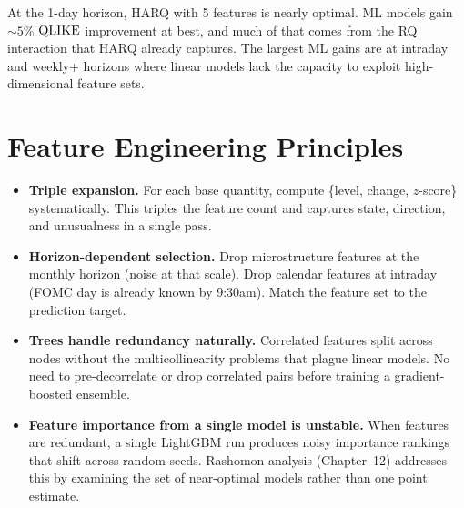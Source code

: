 \begin{warning}
At the 1-day horizon, HARQ with 5 features is nearly optimal.
ML models gain ${\sim}5\%$ $\operatorname{QLIKE}$ improvement at best, and much of that comes from the RQ interaction that HARQ already captures.
The largest ML gains are at intraday and weekly+ horizons where linear models lack the capacity to exploit high-dimensional feature sets.
\end{warning}


\section{Feature Engineering Principles}
\label{sec:engineering-principles}

\begin{itemize}[leftmargin=1.5em, itemsep=6pt]
  \item \textbf{Triple expansion.}
    For each base quantity, compute \{level, change, $z$-score\} systematically.
    This triples the feature count and captures state, direction, and unusualness in a single pass.

  \item \textbf{Horizon-dependent selection.}
    Drop microstructure features at the monthly horizon (noise at that scale).
    Drop calendar features at intraday (FOMC day is already known by 9:30am).
    Match the feature set to the prediction target.

  \item \textbf{Trees handle redundancy naturally.}
    Correlated features split across nodes without the multicollinearity problems that plague linear models.
    No need to pre-decorrelate or drop correlated pairs before training a gradient-boosted ensemble.

  \item \textbf{Feature importance from a single model is unstable.}
    When features are redundant, a single LightGBM run produces noisy importance rankings that shift across random seeds.
    Rashomon analysis (Chapter~12) addresses this by examining the set of near-optimal models rather than one point estimate.
\end{itemize}


